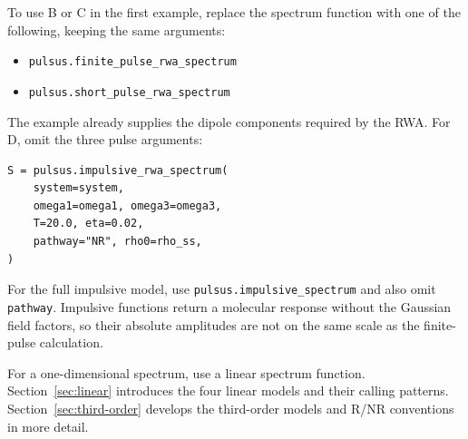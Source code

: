 To use B or C in the first example, replace the spectrum function with
one of the following, keeping the same arguments:
\begin{itemize}
\item \texttt{pulsus.finite\_pulse\_rwa\_spectrum}
\item \texttt{pulsus.short\_pulse\_rwa\_spectrum}
\end{itemize}
The example already supplies the dipole components required by the RWA.
For D, omit the three pulse arguments:
\begin{lstlisting}[style=python]
S = pulsus.impulsive_rwa_spectrum(
    system=system,
    omega1=omega1, omega3=omega3,
    T=20.0, eta=0.02,
    pathway="NR", rho0=rho_ss,
)
\end{lstlisting}
For the full impulsive model, use \texttt{pulsus.impulsive\_spectrum}
and also omit \texttt{pathway}. Impulsive functions return a molecular
response without the Gaussian field factors, so their absolute amplitudes
are not on the same scale as the finite-pulse calculation.

For a one-dimensional spectrum, use a linear spectrum function.
Section~\ref{sec:linear} introduces the four linear models and their
calling patterns. Section~\ref{sec:third-order} develops
the third-order models and R/NR conventions in more detail.
